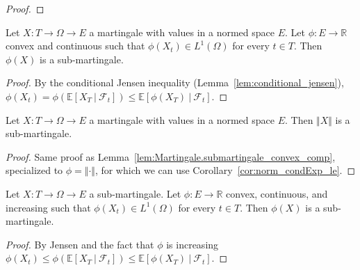 \begin{proof}
  \leanok

\end{proof}


\begin{lemma}\label{lem:Martingale.submartingale_convex_comp}
  \leanok
Let $X : T \rightarrow \Omega\rightarrow E$ a martingale with values in a normed space $E$.
Let $\phi : E \rightarrow \mathbb{R}$ convex and continuous such that
$\phi(X_t)\in L^1(\Omega)$ for every $t\in T$. Then $\phi(X)$ is a sub-martingale.
\end{lemma}

\begin{proof}
  \leanok
  By the conditional Jensen inequality (Lemma~\ref{lem:conditional_jensen}),
  $\phi(X_t) = \phi\left( \mathbb{E}[X_T\ |\ \mathcal{F}_t] \right)\leq \mathbb{E}[\phi(X_T)\ |\ \mathcal{F}_t]$.
\end{proof}


\begin{corollary}\label{cor:Martingale.submartingale_norm}
  \leanok
  Let $X : T \rightarrow \Omega \rightarrow E$ a martingale with values in a normed space $E$.
  Then $\Vert X \Vert$ is a sub-martingale.
\end{corollary}

\begin{proof}
  \leanok
Same proof as Lemma~\ref{lem:Martingale.submartingale_convex_comp}, specialized to $\phi = \Vert \cdot \Vert$, for which we can use Corollary~\ref{cor:norm_condExp_le}.
\end{proof}


\begin{lemma}\label{lem:convex_of_submg_is_submg}
  \leanok
Let $X : T  \rightarrow \Omega \rightarrow E$ a sub-martingale.
Let $\phi:E \rightarrow \mathbb{R}$ convex, continuous, and increasing such that
$\phi(X_t)\in L^1(\Omega)$ for every $t\in T$. Then $\phi(X)$ is a sub-martingale.
\end{lemma}

\begin{proof}
  \leanok
  By Jensen and the fact that $\phi$ is increasing
  $\phi(X_t) \leq \phi\left( \mathbb{E}[X_T\ |\ \mathcal{F}_t] \right)\leq \mathbb{E}[\phi(X_T)\ |\ \mathcal{F}_t]$.
\end{proof}


